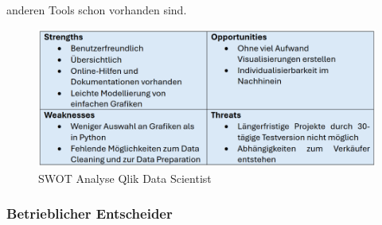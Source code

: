 \documentclass[12pt]{article}
\begin{document}
	anderen Tools schon vorhanden sind.
	\begin{figure}[h]
		\centering
		\includegraphics[width=1.0\textwidth]{SWOT3}
		\caption{SWOT Analyse Qlik Data Scientist}
	\end{figure}
	
	\subsubsection{Betrieblicher Entscheider}
	
\end{document}
